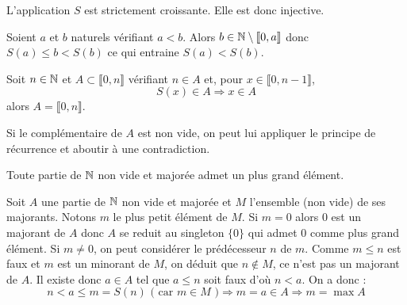 \begin{lemn}\label{lN: SSc}
 L'application $S$ est strictement croissante. Elle est donc injective.
\end{lemn}
\begin{demo}
 Soient $a$ et $b$ naturels vérifiant $a<b$. Alors $b\in \mathbb{N} \setminus \llbracket 0, a \rrbracket$ donc $S(a)\leq b <S(b)$ ce qui entraine $S(a) < S(b)$. 
\end{demo}

\begin{prop}
 Soit $n\in \mathbb{N}$ et $A\subset \llbracket 0,n \rrbracket$ vérifiant $n\in A$ et, pour $x\in \llbracket 0,n-1 \rrbracket$, 
\begin{displaymath}
 S(x) \in A \Rightarrow x \in A
\end{displaymath}
alors $A=\llbracket 0,n \rrbracket$.
\end{prop}
\begin{demo}
Si le complémentaire de $A$ est non vide, on peut lui appliquer le principe de récurrence et aboutir à une contradiction.
\end{demo}

\begin{prop}[\ref{pN: Max}]
 Toute partie de $\mathbb{N}$ non vide et majorée admet un plus grand élément.
\end{prop}
\begin{demo}
 Soit $A$ une partie de $\mathbb{N}$ non vide et majorée et $M$ l'ensemble (non vide) de ses majorants. Notons $m$ le plus petit élément de $M$.\newline
Si $m=0$ alors $0$ est un majorant de $A$ donc $A$ se reduit au singleton $\{0\}$ qui admet $0$ comme plus grand élément.\newline
Si $m\neq 0$, on peut considérer le prédécesseur $n$ de $m$. Comme $m\leq n$ est faux et $m$ est un minorant de $M$, on déduit que $n\not\in M$, ce n'est pas un majorant de $A$. Il existe donc $a\in A$ tel que $a\leq n$ soit faux d'où $n < a$. On a donc :
\begin{displaymath}
 n < a \leq  m = S(n) \text{ ( car $m\in M$ )} \Rightarrow m=a\in A \Rightarrow m = \max A 
\end{displaymath}
\end{demo}

